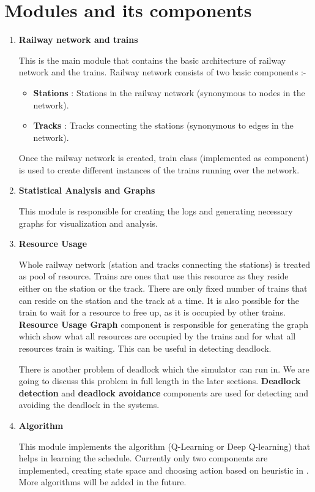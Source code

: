 \section{Modules and its components}
\begin{enumerate}
\item \textbf{Railway network and trains}

This is the main module that contains the basic architecture of railway network and the 
trains. Railway network consists of two basic components :-
\begin{itemize}
\item \textbf{Stations} : Stations in the railway network (synonymous to nodes in the network).
\item \textbf{Tracks} : Tracks connecting the stations (synonymous to edges in the network).
\end{itemize}
Once the railway network is created, train class (implemented as component) is used to create different instances
of the trains running over the network.

\item \textbf{Statistical Analysis and Graphs}

This module is responsible for creating the logs and generating necessary graphs for visualization 
and analysis.

\item \textbf{Resource Usage}

Whole railway network (station and tracks connecting the stations) is treated as pool of resource.
 Trains are ones that use this resource as they reside either on the station or the track. 
There are only fixed number of trains that can reside on the station and the track at a time.
It is also possible for the train to wait for a resource to free up, as it is occupied by other
trains. \textbf{Resource Usage Graph} component is responsible for generating the graph which show
what all resources are occupied by the trains and for what all resources train is waiting. This can be useful in detecting
deadlock.


There is another problem of deadlock which the simulator can run in. We are going to discuss this problem 
in full length in the later sections.\textbf{ Deadlock detection} and \textbf{deadlock avoidance} components
are used for detecting and avoiding the deadlock in the systems.

\item \textbf{Algorithm}

This module implements the algorithm (Q-Learning or Deep Q-learning) that helps in learning
the schedule. Currently only two components are implemented, creating state space and 
choosing action based on heuristic in \cite{ARTICLE:2}. More algorithms will be added in the future.


\end{enumerate}
